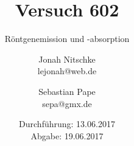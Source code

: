 

\title{Versuch 602}
\subtitle{Röntgenemission und -absorption}
\author{Jonah Nitschke\\
        lejonah@web.de \and
        Sebastian Pape\\
        sepa@gmx.de}
\date{Durchführung: 13.06.2017\\
      Abgabe: 19.06.2017}



\maketitle
\newpage
\setcounter{page}{1}


\newpage


\printbibliography



